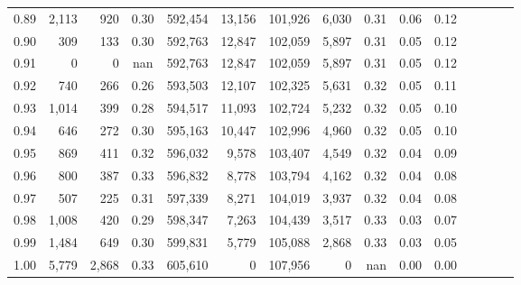 \begin{tabular}{rrrcrrrrrrrrrrr}
0.89 &   2,113 &    920 &                                       0.30 &  592,454 &   13,156 &  101,926 &    6,030 &  0.31 &  0.06 &                         0.12 \\
0.90 &     309 &    133 &                                       0.30 &  592,763 &   12,847 &  102,059 &    5,897 &  0.31 &  0.05 &                         0.12 \\
0.91 &       0 &      0 &                                        nan &  592,763 &   12,847 &  102,059 &    5,897 &  0.31 &  0.05 &                         0.12 \\
0.92 &     740 &    266 &                                       0.26 &  593,503 &   12,107 &  102,325 &    5,631 &  0.32 &  0.05 &                         0.11 \\
0.93 &   1,014 &    399 &                                       0.28 &  594,517 &   11,093 &  102,724 &    5,232 &  0.32 &  0.05 &                         0.10 \\
0.94 &     646 &    272 &                                       0.30 &  595,163 &   10,447 &  102,996 &    4,960 &  0.32 &  0.05 &                         0.10 \\
0.95 &     869 &    411 &                                       0.32 &  596,032 &    9,578 &  103,407 &    4,549 &  0.32 &  0.04 &                         0.09 \\
0.96 &     800 &    387 &                                       0.33 &  596,832 &    8,778 &  103,794 &    4,162 &  0.32 &  0.04 &                         0.08 \\
0.97 &     507 &    225 &                                       0.31 &  597,339 &    8,271 &  104,019 &    3,937 &  0.32 &  0.04 &                         0.08 \\
0.98 &   1,008 &    420 &                                       0.29 &  598,347 &    7,263 &  104,439 &    3,517 &  0.33 &  0.03 &                         0.07 \\
0.99 &   1,484 &    649 &                                       0.30 &  599,831 &    5,779 &  105,088 &    2,868 &  0.33 &  0.03 &                         0.05 \\
1.00 &   5,779 &  2,868 &                                       0.33 &  605,610 &        0 &  107,956 &        0 &   nan &  0.00 &                         0.00 \\
\bottomrule
\end{tabular}
